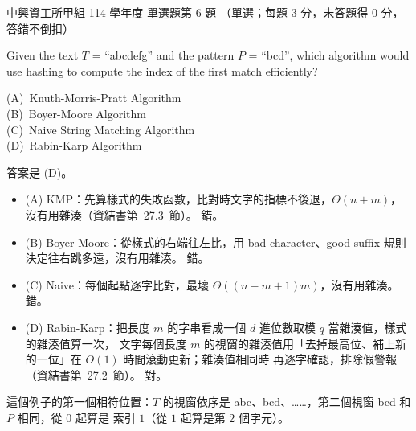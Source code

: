 \begin{pastexam}[label={px:nchu-114-dsa-06}]{中興資工所甲組 114 學年度 單選題第 6 題}
（單選；每題 3 分，未答題得 0 分，答錯不倒扣）

Given the text $T$ = ``abcdefg'' and the pattern $P$ = ``bcd'', which algorithm would use hashing to compute the index of the first match efficiently?

(A)~Knuth-Morris-Pratt Algorithm\\
(B)~Boyer-Moore Algorithm\\
(C)~Naive String Matching Algorithm\\
(D)~Rabin-Karp Algorithm
\end{pastexam}

\begin{pastsoln}
答案是 (D)。

\begin{itemize}
\item (A) KMP：先算樣式的失敗函數，比對時文字的指標不後退，$\Theta(n + m)$，沒有用雜湊（資結書第~27.3~節）。 錯。
\item (B) Boyer-Moore：從樣式的右端往左比，用 bad character、good suffix 規則決定往右跳多遠，沒有用雜湊。 錯。
\item (C) Naive：每個起點逐字比對，最壞 $\Theta((n - m + 1)m)$，沒有用雜湊。 錯。
\item (D) Rabin-Karp：把長度 $m$ 的字串看成一個 $d$ 進位數取模 $q$ 當雜湊值，樣式的雜湊值算一次，
文字每個長度 $m$ 的視窗的雜湊值用「去掉最高位、補上新的一位」在 $O(1)$ 時間滾動更新；雜湊值相同時
再逐字確認，排除假警報（資結書第~27.2~節）。 對。
\end{itemize}
這個例子的第一個相符位置：$T$ 的視窗依序是 abc、bcd、……，第二個視窗 bcd 和 $P$ 相同，從 $0$ 起算是
索引 $1$（從 $1$ 起算是第 $2$ 個字元）。
\end{pastsoln}

